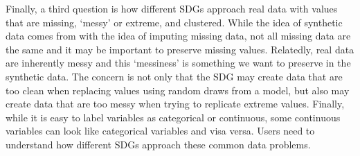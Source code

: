 Finally, a third question is how different SDGs approach real data with values that are missing, `messy' or extreme, and clustered.  While the idea of synthetic data comes from with the idea of imputing missing data, not all missing data are the same and it may be important to preserve missing values.  Relatedly, real data are inherently messy and this `messiness' is something we want to preserve in the synthetic data.  The concern is not only that the SDG may create data that are too clean when replacing values using random draws from a model, but also may create data that are too messy when trying to replicate extreme values.  Finally, while it is easy to label variables as categorical or continuous, some continuous variables can look like categorical variables and visa versa.  Users need to understand how different SDGs approach these common data problems.